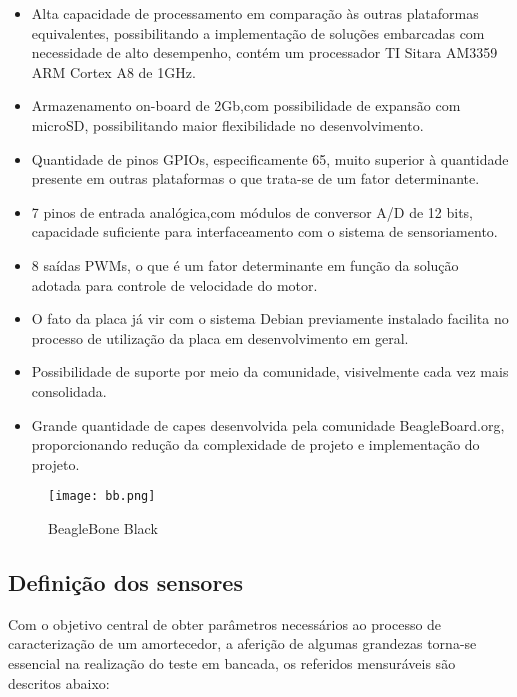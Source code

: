 	\begin{itemize}

		\item Alta capacidade de processamento em comparação às outras plataformas equivalentes, possibilitando a implementação de soluções embarcadas com necessidade de alto desempenho, contém um processador TI Sitara AM3359 ARM Cortex A8 de 1GHz.

		\item Armazenamento on-board de 2Gb,com possibilidade de expansão com microSD, possibilitando maior flexibilidade no desenvolvimento.

		\item Quantidade de pinos GPIOs, especificamente 65, muito superior à quantidade presente em outras plataformas o que trata-se de um fator determinante.

		\item 7 pinos de entrada analógica,com módulos de conversor A/D de 12 bits, capacidade suficiente para interfaceamento com o sistema de sensoriamento.

		\item 8 saídas PWMs, o que é um fator determinante em função da solução adotada para controle de velocidade do motor.

		\item O fato da placa já vir com o sistema Debian previamente instalado facilita no processo de utilização da placa em desenvolvimento em geral.

		\item Possibilidade de suporte por meio da comunidade, visivelmente cada vez mais consolidada.

		\item Grande quantidade de capes desenvolvida pela comunidade BeagleBoard.org, proporcionando redução da complexidade de projeto e implementação do projeto.

	\end{itemize}

	\begin{figure}[!h]
		\centering
		\texttt{[image: bb.png]}
		\caption{BeagleBone Black}
		\label{beaglebone}
	\end{figure}	

\subsection{Definição dos sensores}

	Com o objetivo central de obter parâmetros necessários ao processo de caracterização de um amortecedor, a aferição de algumas grandezas torna-se essencial na realização do teste em bancada, os referidos mensuráveis são descritos abaixo:

